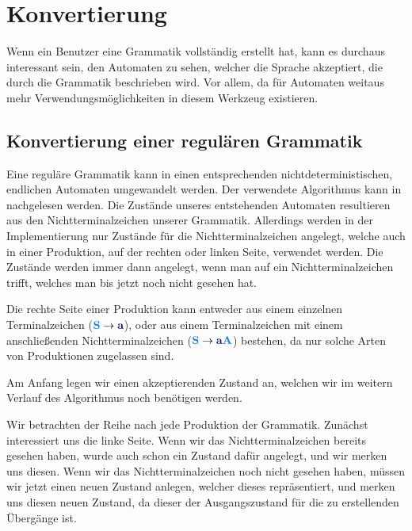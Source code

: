 \section{Konvertierung}\label{ConverToGrammar}

Wenn ein Benutzer eine Grammatik vollständig erstellt hat, kann es durchaus
interessant sein, den Automaten zu sehen, welcher die Sprache akzeptiert, die
durch die Grammatik beschrieben wird. Vor allem, da für Automaten weitaus mehr
Verwendungsmöglichkeiten in diesem Werkzeug existieren.\vspace{10pt}


\subsection{Konvertierung einer regulären Grammatik}\label{ConverToGrammarRegular}

Eine reguläre Grammatik kann in einen entsprechenden nichtdeterministischen,
endlichen Automaten umgewandelt werden. Der verwendete Algorithmus kann in
\cite{Compilers} nachgelesen werden. Die Zustände unseres entstehenden Automaten
resultieren aus den Nichtterminalzeichen unserer Grammatik. Allerdings werden in
der Implementierung nur Zustände für die Nichtterminalzeichen angelegt, welche
auch in einer Produktion, auf der rechten oder linken Seite, verwendet werden.
Die Zustände werden immer dann angelegt, wenn man auf ein Nichtterminalzeichen
trifft, welches man bis jetzt noch nicht gesehen hat.\vspace{10pt}

Die rechte Seite einer Produktion kann entweder aus einem einzelnen
Terminalzeichen ($\NonterminalSymbol{S} \to \TerminalSymbol{a}$), oder
aus einem Terminalzeichen mit einem anschließenden Nichtterminalzeichen
($\NonterminalSymbol{S} \to \TerminalSymbol{a}\NonterminalSymbol{A}$) bestehen,
da nur solche Arten von Produktionen zugelassen sind.\vspace{10pt}

Am Anfang legen wir einen akzeptierenden Zustand an, welchen wir im weitern
Verlauf des Algorithmus noch benötigen werden.\vspace{10pt}

 Wir betrachten der Reihe nach
jede Produktion der Grammatik. Zunächst interessiert uns die linke Seite. Wenn wir das Nichtterminalzeichen
bereits gesehen haben, wurde auch schon ein Zustand dafür angelegt, und wir
merken uns diesen. Wenn wir das Nichtterminalzeichen noch nicht gesehen haben,
müssen wir jetzt einen neuen Zustand anlegen, welcher dieses repräsentiert, und
merken uns diesen neuen Zustand, da dieser der Ausgangszustand
für die zu erstellenden Übergänge ist.\vspace{10pt}

